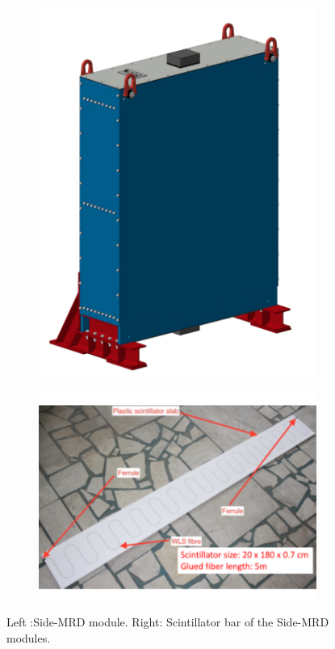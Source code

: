 \begin{figure}[tbhp]
  \begin{center}
   \begin{subfigure}{0.48\textwidth}
     \includegraphics[width=\linewidth]{fig/SMRD_Module.pdf}
    \end{subfigure}
  \begin{subfigure}{0.48\textwidth}
      \includegraphics[width=\linewidth]{fig/side_mrd_scintillator.pdf}
    \end{subfigure}    
    \end{center}
  \caption{Left :Side-MRD module. Right: Scintillator bar of the Side-MRD modules.}
\label{fig:side_mrd}
\end{figure}


